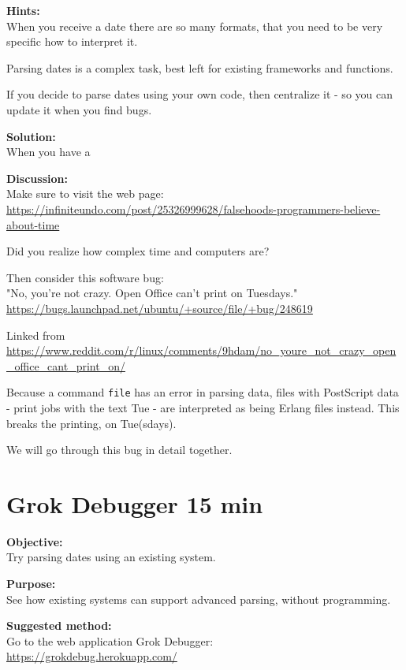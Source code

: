 \documentclass[a4paper,11pt,notitlepage]{report}
\begin{document}
{\bf Hints:}\\
When you receive a date there are so many formats, that you need to be very specific how to interpret it.

Parsing dates is a complex task, best left for existing frameworks and functions.

If you decide to parse dates using your own code, then centralize it - so you can update it when you find bugs.

{\bf Solution:}\\
When you have a

{\bf Discussion:}\\
Make sure to visit the web page:\\
\url{https://infiniteundo.com/post/25326999628/falsehoods-programmers-believe-about-time}

Did you realize how complex time and computers are?

Then consider this software bug:\\
"No, you're not crazy. Open Office can't print on Tuesdays."\\
\url{https://bugs.launchpad.net/ubuntu/+source/file/+bug/248619}

Linked from\\
{\footnotesize\url{https://www.reddit.com/r/linux/comments/9hdam/no_youre_not_crazy_open_office_cant_print_on/}}

Because a command \verb+file+ has an error in parsing data, files with PostScript data - print jobs with the text Tue - are interpreted as being Erlang files instead. This breaks the printing, on Tue(sdays).

We will go through this bug in detail together.


\chapter{Grok Debugger 15 min}
\label{ex:grokdebugger1}


{\bf Objective:}\\
Try parsing dates using an existing system.

{\bf Purpose:}\\
See how existing systems can support advanced parsing, without programming.

{\bf Suggested method:}\\
Go to the web application Grok Debugger:\\
\url{https://grokdebug.herokuapp.com/}
\end{document}
